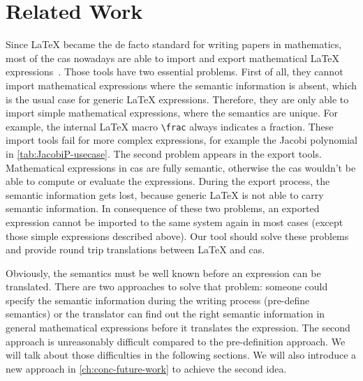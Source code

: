 \section{Related Work}\label{sec:related-work}
Since \LaTeX{} became the de facto standard for writing papers in mathematics, most of the \gls{cas} nowadays are able to import and export mathematical \LaTeX{} expressions~\cite{Maple:ImportExport,Mathematica:ImportExport,Matlab:ImportExport,Sage:ImportExport}. Those tools have two essential problems. First of all, they cannot import mathematical expressions where the semantic information is absent, which is the usual case for generic \LaTeX{} expressions. Therefore, they are only able to import simple mathematical expressions, where the semantics are unique. For example, the internal \LaTeX{} macro \verb|\frac| always indicates a fraction. These import tools fail for more complex expressions, for example the Jacobi polynomial in \cref{tab:JacobiP-usecase}. The second problem appears in the export tools. Mathematical expressions in \gls{cas} are fully semantic, otherwise the \gls{cas} wouldn't be able to compute or evaluate the expressions. During the export process, the semantic information gets lost, because generic \LaTeX{} is not able to carry semantic information. In consequence of these two problems, an exported expression cannot be imported to the same system again in most cases (except those simple expressions described above). Our tool should solve these problems and provide round trip translations between \LaTeX{} and \gls{cas}.

Obviously, the semantics must be well known before an expression can be translated. There are two approaches to solve that problem: someone could specify the semantic information during the writing process (pre-define semantics) or the translator can find out the right semantic information in general mathematical expressions before it translates the expression. The second approach is unreasonably difficult compared to the pre-definition approach. We will talk about those difficulties in the following sections. We will also introduce a new approach in \cref{ch:conc-future-work} to achieve the second idea.

